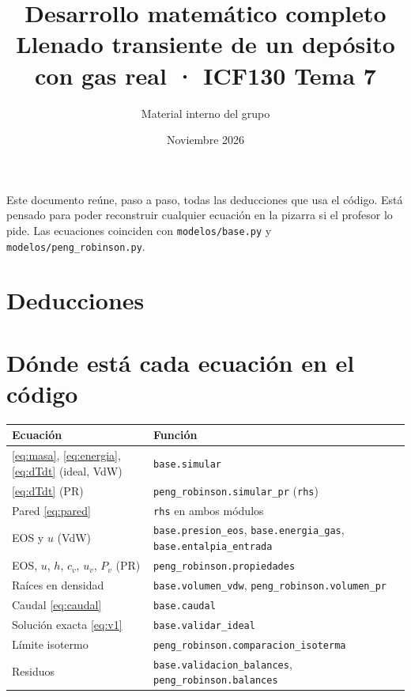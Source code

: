 \documentclass[11pt]{article}
\title{\color{tinta}\textbf{Desarrollo matemático completo}\\[4pt]\large Llenado transiente de un depósito con gas real · ICF130 Tema 7}
\author{Material interno del grupo}
\date{Noviembre 2026}
\begin{document}
\maketitle
Este documento reúne, paso a paso, todas las deducciones que usa el código. Está pensado para poder
reconstruir cualquier ecuación en la pizarra si el profesor lo pide. Las ecuaciones coinciden con
\texttt{modelos/base.py} y \texttt{modelos/peng\_robinson.py}.
\section{Deducciones}

\section{Dónde está cada ecuación en el código}
\begin{center}\small
\begin{tabular}{ll}\toprule
Ecuación & Función\\\midrule
\eqref{eq:masa}, \eqref{eq:energia}, \eqref{eq:dTdt} (ideal, VdW) & \texttt{base.simular}\\
\eqref{eq:dTdt} (PR) & \texttt{peng\_robinson.simular\_pr} (\texttt{rhs})\\
Pared \eqref{eq:pared} & \texttt{rhs} en ambos módulos\\
EOS y $u$ (VdW) & \texttt{base.presion\_eos}, \texttt{base.energia\_gas}, \texttt{base.entalpia\_entrada}\\
EOS, $u$, $h$, $c_v$, $u_v$, $P_v$ (PR) & \texttt{peng\_robinson.propiedades}\\
Raíces en densidad & \texttt{base.volumen\_vdw}, \texttt{peng\_robinson.volumen\_pr}\\
Caudal \eqref{eq:caudal} & \texttt{base.caudal}\\
Solución exacta \eqref{eq:v1} & \texttt{base.validar\_ideal}\\
Límite isotermo & \texttt{peng\_robinson.comparacion\_isoterma}\\
Residuos & \texttt{base.validacion\_balances}, \texttt{peng\_robinson.balances}\\\bottomrule
\end{tabular}\end{center}
\end{document}
